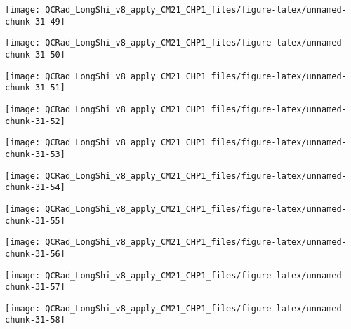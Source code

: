 \documentclass[
  10pt,
  a4paper,oneside]{article}
\begin{document}
\begin{center}\texttt{[image: QCRad\_LongShi\_v8\_apply\_CM21\_CHP1\_files/figure-latex/unnamed-chunk-31-49]} \end{center}

\begin{center}\texttt{[image: QCRad\_LongShi\_v8\_apply\_CM21\_CHP1\_files/figure-latex/unnamed-chunk-31-50]} \end{center}

\begin{center}\texttt{[image: QCRad\_LongShi\_v8\_apply\_CM21\_CHP1\_files/figure-latex/unnamed-chunk-31-51]} \end{center}

\begin{center}\texttt{[image: QCRad\_LongShi\_v8\_apply\_CM21\_CHP1\_files/figure-latex/unnamed-chunk-31-52]} \end{center}

\begin{center}\texttt{[image: QCRad\_LongShi\_v8\_apply\_CM21\_CHP1\_files/figure-latex/unnamed-chunk-31-53]} \end{center}

\begin{center}\texttt{[image: QCRad\_LongShi\_v8\_apply\_CM21\_CHP1\_files/figure-latex/unnamed-chunk-31-54]} \end{center}

\begin{center}\texttt{[image: QCRad\_LongShi\_v8\_apply\_CM21\_CHP1\_files/figure-latex/unnamed-chunk-31-55]} \end{center}

\begin{center}\texttt{[image: QCRad\_LongShi\_v8\_apply\_CM21\_CHP1\_files/figure-latex/unnamed-chunk-31-56]} \end{center}

\begin{center}\texttt{[image: QCRad\_LongShi\_v8\_apply\_CM21\_CHP1\_files/figure-latex/unnamed-chunk-31-57]} \end{center}

\begin{center}\texttt{[image: QCRad\_LongShi\_v8\_apply\_CM21\_CHP1\_files/figure-latex/unnamed-chunk-31-58]} \end{center}
\end{document}
